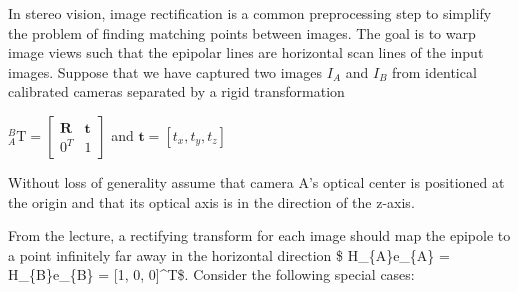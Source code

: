 \documentclass[11pt]{article}
\begin{document}
In stereo vision, image rectification is a common preprocessing step to
simplify the problem of finding matching points between images. The goal
is to warp image views such that the epipolar lines are horizontal scan
lines of the input images. Suppose that we have captured two images
\(I_A\) and \(I_B\) from identical calibrated cameras separated by a
rigid transformation

\(_{A}^{B}\textrm{T}= \begin{bmatrix} \boldsymbol{R} & \boldsymbol{t} \\ 0^T & 1 \end{bmatrix}\)
and \(\boldsymbol{t}=[t_x,t_y,t_z]\)

Without loss of generality assume that camera A's optical center is
positioned at the origin and that its optical axis is in the direction
of the z-axis.

From the lecture, a rectifying transform for each image should map the
epipole to a point infinitely far away in the horizontal direction \$
H\_\{A\}e\_\{A\} = H\_\{B\}e\_\{B\} = {[}1, 0, 0{]}\^{}T\$. Consider the
following special cases:
\end{document}
